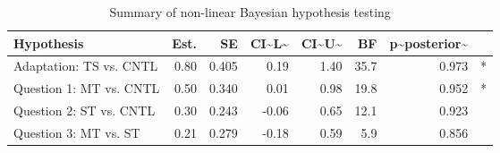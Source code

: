 \begin{table}

\caption{\label{tab:unnamed-chunk-29}Summary of non-linear Bayesian hypothesis testing}
\centering
\begin{tabular}[t]{l|r|r|r|r|r|r|l}
\hline
Hypothesis & Est. & SE & CI\textasciitilde{}L\textasciitilde{} & CI\textasciitilde{}U\textasciitilde{} & BF & p\textasciitilde{}posterior\textasciitilde{} & \\
\hline
Adaptation: TS vs. CNTL & 0.80 & 0.405 & 0.19 & 1.40 & 35.7 & 0.973 & *\\
\hline
Question 1: MT vs. CNTL & 0.50 & 0.340 & 0.01 & 0.98 & 19.8 & 0.952 & *\\
\hline
Question 2: ST vs. CNTL & 0.30 & 0.243 & -0.06 & 0.65 & 12.1 & 0.923 & \\
\hline
Question 3: MT vs. ST & 0.21 & 0.279 & -0.18 & 0.59 & 5.9 & 0.856 & \\
\hline
\end{tabular}
\end{table}
